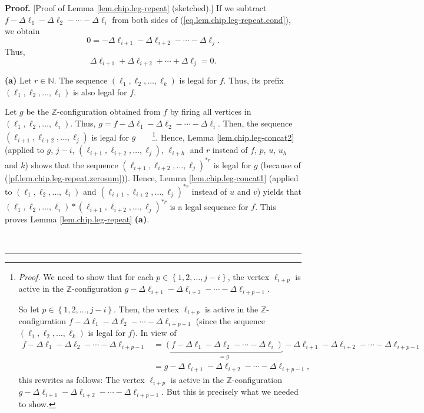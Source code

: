 \documentclass[numbers=enddot,12pt,final,onecolumn,notitlepage]{scrartcl}%
\theoremstyle{definition}
\newenvironment{proof}[1][Proof]{\noindent\textbf{#1.} }{\ \rule{0.5em}{0.5em}}
\begin{document}
\begin{proof}
[Proof of Lemma \ref{lem.chip.leg-repeat} (sketched).] If we subtract
$f-\Delta\ell_{1}-\Delta\ell_{2}-\cdots-\Delta\ell_{i}$ from both sides of
(\ref{eq.lem.chip.leg-repeat.cond}), we obtain%
\[
0=-\Delta\ell_{i+1}-\Delta\ell_{i+2}-\cdots-\Delta\ell_{j}.
\]
Thus,%
\begin{equation}
\Delta\ell_{i+1}+\Delta\ell_{i+2}+\cdots+\Delta\ell_{j}%
=0.\label{pf.lem.chip.leg-repeat.zerosum}%
\end{equation}


\textbf{(a)} Let $r\in\mathbb{N}$. The sequence $\left(  \ell_{1},\ell
_{2},\ldots,\ell_{k}\right)  $ is legal for $f$. Thus, its prefix $\left(
\ell_{1},\ell_{2},\ldots,\ell_{i}\right)  $ is also legal for $f$.

Let $g$ be the $\mathbb{Z}$-configuration obtained from $f$ by firing all
vertices in $\left(  \ell_{1},\ell_{2},\ldots,\ell_{i}\right)  $. Thus,
$g=f-\Delta\ell_{1}-\Delta\ell_{2}-\cdots-\Delta\ell_{i}$. Then, the sequence
$\left(  \ell_{i+1},\ell_{i+2},\ldots,\ell_{j}\right)  $ is legal for
$g$\ \ \ \ \footnote{\textit{Proof.} We need to show that for each
$p\in\left\{  1,2,\ldots,j-i\right\}  $, the vertex $\ell_{i+p}$ is active in
the $\mathbb{Z}$-configuration $g-\Delta\ell_{i+1}-\Delta\ell_{i+2}%
-\cdots-\Delta\ell_{i+p-1}$.
\par
So let $p\in\left\{  1,2,\ldots,j-i\right\}  $. Then, the vertex $\ell_{i+p}$
is active in the $\mathbb{Z}$-configuration $f-\Delta\ell_{1}-\Delta\ell
_{2}-\cdots-\Delta\ell_{i+p-1}$ (since the sequence $\left(  \ell_{1},\ell
_{2},\ldots,\ell_{k}\right)  $ is legal for $f$). In view of%
\begin{align*}
f-\Delta\ell_{1}-\Delta\ell_{2}-\cdots-\Delta\ell_{i+p-1}  &
=\underbrace{\left(  f-\Delta\ell_{1}-\Delta\ell_{2}-\cdots-\Delta\ell
_{i}\right)  }_{=g}-\Delta\ell_{i+1}-\Delta\ell_{i+2}-\cdots-\Delta
\ell_{i+p-1}\\
& =g-\Delta\ell_{i+1}-\Delta\ell_{i+2}-\cdots-\Delta\ell_{i+p-1},
\end{align*}
this rewrites as follows: The vertex $\ell_{i+p}$ is active in the
$\mathbb{Z}$-configuration $g-\Delta\ell_{i+1}-\Delta\ell_{i+2}-\cdots
-\Delta\ell_{i+p-1}$. But this is precisely what we needed to show.}. Hence,
Lemma \ref{lem.chip.leg-concat2} (applied to $g$, $j-i$, $\left(  \ell
_{i+1},\ell_{i+2},\ldots,\ell_{j}\right)  $, $\ell_{i+h}$ and $r$ instead of
$f$, $p$, $u$, $u_{h}$ and $k$) shows that the sequence $\left(  \ell
_{i+1},\ell_{i+2},\ldots,\ell_{j}\right)  ^{\ast r}$ is legal for $g$ (because
of (\ref{pf.lem.chip.leg-repeat.zerosum})). Hence, Lemma
\ref{lem.chip.leg-concat1} (applied to $\left(  \ell_{1},\ell_{2},\ldots
,\ell_{i}\right)  $ and $\left(  \ell_{i+1},\ell_{i+2},\ldots,\ell_{j}\right)
^{\ast r}$ instead of $u$ and $v$) yields that $\left(  \ell_{1},\ell
_{2},\ldots,\ell_{i}\right)  \ast\left(  \ell_{i+1},\ell_{i+2},\ldots,\ell
_{j}\right)  ^{\ast r}$ is a legal sequence for $f$. This proves Lemma
\ref{lem.chip.leg-repeat} \textbf{(a)}.


\end{proof}
\end{document}
